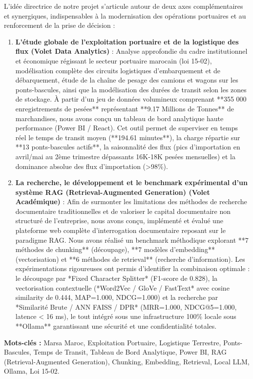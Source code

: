 \documentclass[12pt,a4paper,oneside]{report}
\begin{document}
L'idée directrice de notre projet s'articule autour de deux axes complémentaires et synergiques, indispensables à la modernisation des opérations portuaires et au renforcement de la prise de décision :
\begin{enumerate}
    \item \textbf{L'étude globale de l'exploitation portuaire et de la logistique des flux (Volet Data Analytics)} : Analyse approfondie du cadre institutionnel et économique régissant le secteur portuaire marocain (loi 15-02), modélisation complète des circuits logistiques d'embarquement et de débarquement, étude de la chaîne de pesage des camions et wagons sur les ponts-bascules, ainsi que la modélisation des durées de transit selon les zones de stockage. À partir d'un jeu de données volumineux comprenant **355 000 enregistrements de pesées** représentant **9.17 Millions de Tonnes** de marchandises, nous avons conçu un tableau de bord analytique haute performance (Power BI / React). Cet outil permet de superviser en temps réel le temps de transit moyen (**194.61 minutes**), la charge répartie sur **13 ponts-bascules actifs**, la saisonnalité des flux (pics d'importation en avril/mai au 2ème trimestre dépassants 16K-18K pesées mensuelles) et la dominance absolue des flux d'importation (>98\%).
    \item \textbf{La recherche, le développement et le benchmark expérimental d'un système RAG (Retrieval-Augmented Generation) (Volet Académique)} : Afin de surmonter les limitations des méthodes de recherche documentaire traditionnelles et de valoriser le capital documentaire non structuré de l'entreprise, nous avons conçu, implémenté et évalué une plateforme web complète d'interrogation documentaire reposant sur le paradigme RAG. Nous avons réalisé un benchmark méthodique explorant **7 méthodes de chunking** (découpage), **7 modèles d'embedding** (vectorisation) et **6 méthodes de retrieval** (recherche d'information). Les expérimentations rigoureuses ont permis d'identifier la combinaison optimale : le découpage par *Fixed Character Splitter* (F1-score de 0.828), la vectorisation contextuelle (*Word2Vec / GloVe / FastText* avec cosine similarity de 0.444, MAP=1.000, NDCG=1.000) et la recherche par *Similarité Brute / ANN FAISS / DPR* (MRR=1.000, NDCG@5=1.000, latence < 16 ms), le tout intégré sous une infrastructure 100\% locale sous **Ollama** garantissant une sécurité et une confidentialité totales.
\end{enumerate}

\textbf{Mots-clés :} Marsa Maroc, Exploitation Portuaire, Logistique Terrestre, Ponts-Bascules, Temps de Transit, Tableau de Bord Analytique, Power BI, RAG (Retrieval-Augmented Generation), Chunking, Embedding, Retrieval, Local LLM, Ollama, Loi 15-02.
\end{document}
